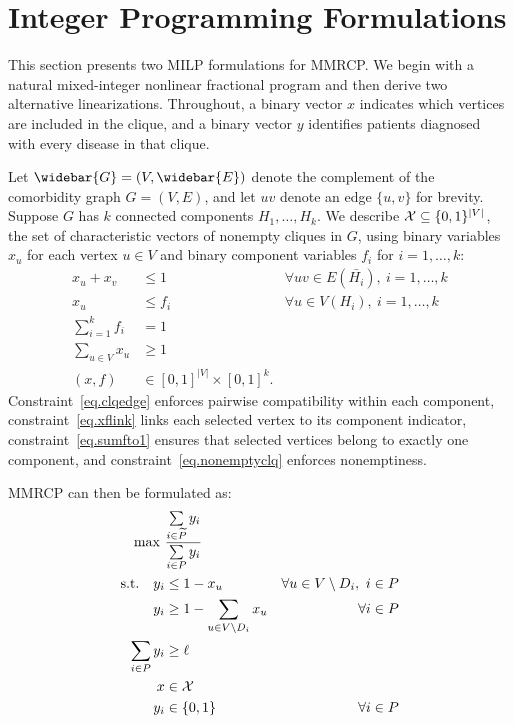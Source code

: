 \section{Integer Programming Formulations}\label{sec.formulations}

This section presents two MILP formulations for MMRCP. We begin with
a natural mixed-integer nonlinear fractional program and then derive
two alternative linearizations. Throughout, a binary vector $x$
indicates which vertices are included in the clique, and a binary
vector $y$ identifies patients diagnosed with every disease in that
clique. 

Let $\widebar{G} = (V, \widebar{E})$ denote the complement of the
comorbidity graph $G = (V, E)$, and let $uv$ denote an edge $\{u,v\}$
for brevity. Suppose $G$ has $k$ connected components
$H_1,\ldots,H_k$. We describe $\mathcal{X} \subseteq \{0,1\}^{|V|}$, the
set of characteristic vectors of nonempty cliques in $G$, using
binary variables $x_u$ for each vertex $u \in V$ and binary component
variables $f_i$ for $i=1,\ldots,k$:
\begin{align}
\label{eq.clqedge}  x_u + x_v &\le 1 & \forall uv \in E(\bar{H_i}),\
i=1,\ldots,k \\
\label{eq.xflink} x_u &\le f_i & \forall u \in V(H_i),\
i=1,\ldots,k \\
\label{eq.sumfto1} \sum_{i=1}^k f_i &= 1 \\
\label{eq.nonemptyclq} \sum_{u \in V} x_u &\ge 1 \\
\label{eq.xfbounds} (x,f) &\in [0,1]^{|V|} \times [0,1]^{k}.
\end{align}
Constraint~\eqref{eq.clqedge} enforces pairwise compatibility within
each component, constraint~\eqref{eq.xflink} links each selected
vertex to its component indicator, constraint~\eqref{eq.sumfto1}
ensures that selected vertices belong to exactly one component,
and constraint~\eqref{eq.nonemptyclq} enforces nonemptiness. 

MMRCP can then be formulated as:
\begin{subequations}\label{form.fracIP}
\begin{align}
  \max\ & \frac{\sum\limits_{i \in \widetilde{P}} y_i}{\sum\limits_{i
  \in P} y_i}
  \label{eq.fraclinear} \\
  \text{s.t.}\quad
  y_i &\le 1 - x_u & \forall u \in V\setminus D_i,\ i \in P
  \label{eq.xyconnectupper-disagg} \\
  y_i &\ge 1 - \sum_{u \in V\setminus D_i} x_u & \forall i \in P
  \label{eq.xyconnectlowerFP} \\
  \sum_{i \in P} y_i &\ge \ell \label{eq.denomLB} \\
  x &\in \mathcal{X} \label{eq.xbin} \\
  y_i &\in \{0,1\} & \forall i \in P \label{eq.ybin}
\end{align}
\end{subequations}

